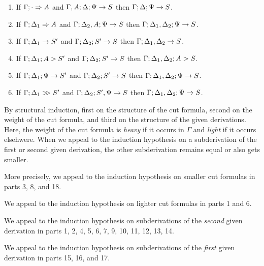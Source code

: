 \documentclass{sig-alt}
\begin{document}
\begin{Teorema}
\begin{enumerate}
\item If $\Gamma;\cdot\Rightarrow A$ and $\Gamma, A;\Delta;\Psi\rightarrow S$ then $\Gamma;\Delta;\Psi\rightarrow S$.
\item If $\Gamma;\Delta_1\Rightarrow A$ and $\Gamma;\Delta_2, A;\Psi\rightarrow S$ then $\Gamma;\Delta_1, \Delta_2;\Psi\rightarrow S$.
\\
\item If $\Gamma;\Delta_1\rightarrow S'$ and $\Gamma;\Delta_2;S'\rightarrow S$ then $\Gamma;\Delta_1,\Delta_2\rightarrow S$.
\item If $\Gamma;\Delta_1;A\mathrel>S'$ and $\Gamma;\Delta_2;S'\rightarrow S$ then $\Gamma;\Delta_1,\Delta_2;A\mathrel>S$.
\item If $\Gamma;\Delta_1;\Psi\rightarrow S'$ and $\Gamma;\Delta_2;S'\rightarrow S$ then $\Gamma;\Delta_1,\Delta_2;\Psi\rightarrow S$.
\item If $\Gamma;\Delta_1\mathrel{>\!\! >}S'$ and $\Gamma;\Delta_2;S',\Psi\rightarrow S$ then $\Gamma;\Delta_1,\Delta_2;\Psi\rightarrow S$.
\end{enumerate}
\end{Teorema}

\begin{Demo}
By structural induction, first on the structure of the cut formula,
second on the weight of the cut formula, and third on the structure of
the given derivations.  Here, the weight of the cut formula is
\emph{heavy} if it occurs in $\Gamma$ and \emph{light} if it occurs
elsehwere.  When we appeal to the induction hypothesis on a subderivation
of the first or second given derivation, the other subderivation remains
equal or also gets smaller.

More precisely, we appeal to the induction hypothesis
on smaller cut formulas in parts 3, 8, and 18.

We appeal to the induction hypothesis on lighter cut formulas
in parts 1 and 6.

We appeal to the induction hypothesis
on subderivations of the \emph{second} given derivation
in parts 1, 2, 4, 5, 6, 7, 9, 10, 11, 12, 13, 14.

We appeal to the induction hypothesis
on subderivations of the \emph{first} given derivation
in parts 15, 16, and 17.


\end{Demo}
\end{document}
